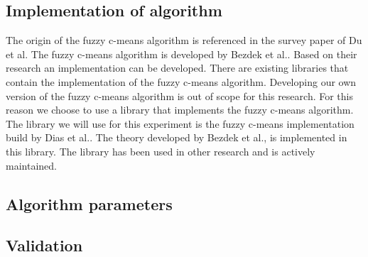 \documentclass[../../main]{subfiles}
\begin{document}
\subsection{Implementation of algorithm}
The origin of the fuzzy c-means algorithm is referenced in the survey paper of Du et al\cite{Du2010Clustering:Approach}.
The fuzzy c-means algorithm is developed by Bezdek et al.\cite{Bezdek1984FCM:Algorithm}.
Based on their research an implementation can be developed.
There are existing libraries that contain the implementation of the fuzzy c-means algorithm.
Developing our own version of the fuzzy c-means algorithm is out of scope for this research.
For this reason we choose to use a library that implements the fuzzy c-means algorithm.
The library we will use for this experiment is the fuzzy c-means implementation build by Dias et al.\cite{dias2019fuzzy}.
The theory developed by Bezdek et al., is implemented in this library.
The library has been used in other research\cite{DeAlmeidaNeto2020, Kopf2019, Nwadiugwu2020} and is actively maintained.

\subsection{Algorithm parameters}

\subsection{Validation}
\end{document}
